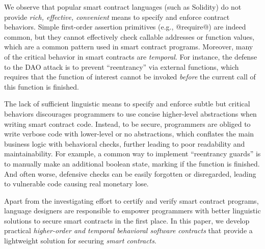

We observe that popular smart contract languages (such as Solidity) do
not provide \emph{rich, effective, convenient} means to specify and enforce
contract behaviors.
Simple first-order assertion primitives (e.g., @require@) are indeed common,
but they cannot effectively check callable addresses or function values, which
are a common pattern used in smart contract programs.
Moreover, many of the critical behavior in smart contracts are \emph{temporal}.
For instance, the defense to the DAO attack  is to
prevent ``reentrancy'' via external functions, which requires that the function
of interest cannot be invoked \emph{before} the current call of this function is finished.

The lack of sufficient linguistic means to specify and enforce subtle but
critical behaviors discourages programmers to use concise higher-level
abstractions when writing smart contract code.
Instead, to be secure, programmers are obliged to write verbose code with
lower-level or no abstractions, which conflates the main business logic with
behavioral checks, further leading to poor readability and maintainability.
For example, a common way to implement ``reentrancy guards'' is to manually
make an additional boolean state, marking if the function is finished.
And often worse, defensive checks can be easily forgotten or disregarded,
leading to vulnerable code causing real monetary lose.

Apart from the investigating effort to certify and verify smart contract
programs, language designers are responsible to empower programmers with better
linguistic solutions to secure smart contracts in the first place.
In this paper, we develop practical \emph{higher-order and temporal behavioral
software contracts} that provide a lightweight solution for securing
\emph{smart contracts}.

